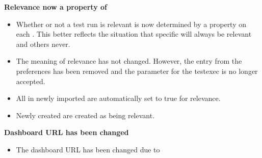\textbf{Relevance now a property of \gdsuites{}}
\begin{itemize}
\item Whether or not a test run is relevant is now determined by a property on each \gdsuite{}. This better reflects the situation that specific \gdsuites{} will always be relevant and others never. 
\item The meaning of relevance has not changed. However, the entry from the preferences has been removed and the parameter for the testexec is no longer accepted. 
\item All \gdsuites{} in newly imported \gdprojects{} are automatically set to true for relevance.
\item Newly created \gdsuites{} are created as being relevant.
\end{itemize}

\textbf{Dashboard URL has been changed}
\begin{itemize}
\item The dashboard URL has been changed due to 
\end{itemize}

